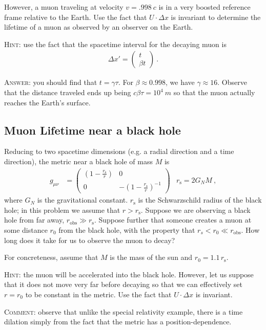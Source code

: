 \documentclass[12pt]{article}
\numberwithin{equation}{section}    %
\begin{document}
However, a muon traveling at velocity $v=.998~c$ is in a very boosted reference frame relative to the Earth. Use the fact that $U\cdot \Delta x$ is invariant to determine the lifetime of a muon as observed by an observer on the Earth. 

\textsc{Hint:} use the fact that the spacetime interval for the decaying muon is 
\begin{align}
	\Delta x' =
	\begin{pmatrix}
		t\\
		\beta t
	\end{pmatrix} \ .
\end{align}

\textsc{Answer:} you should find that $t = \gamma \tau$. For $\beta \approx 0.998$, we have $\gamma \approx 16$. Observe that the distance traveled ends up being $c\beta \tau = 10^4~m$ so that the muon actually reaches the Earth's surface.



\subsection{Muon Lifetime near a black hole}

Reducing to two spacetime dimensions (e.g. a radial direction and a time direction), the metric near a black hole of mass $M$ is
\begin{align}
	g_{\mu\nu} &= 
	\begin{pmatrix}
		\left(1-\frac{r_\text{s}}{r}\right) & 0\\
		0 & -\left(1-\frac{r_\text{s}}{r}\right)^{-1}
	\end{pmatrix}
	&
	r_\text{s} = 2G_N M \ ,
\end{align}
where $G_N$ is the gravitational constant. $r_\text{s}$ is the Schwarzschild radius of the black hole; in this problem we assume that $r>r_\text{s}$. Suppose we are observing a black hole from far away, $r_\text{obs}\gg r_\text{s}$. Suppose further that someone creates a muon at some distance $r_0$ from the black hole, with the property that $r_s < r_0 \ll r_\text{obs}$. How long does it take for us to observe the muon to decay? 

For concreteness, assume that $M$ is the mass of the sun and $r_0 = 1.1\, r_\text{s}$.

\textsc{Hint:} the muon will be accelerated into the black hole. However, let us suppose that it does not move very far before decaying so that we can effectively set $r=r_0$ to be constant in the metric. Use the fact that $U\cdot\Delta x$ is invariant.

\textsc{Comment:} observe that unlike the special relativity example, there is a time dilation simply from the fact that the metric has a position-dependence.




\end{document}
